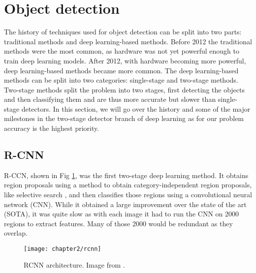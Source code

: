 

\section{Object detection}
The history of techniques used for object detection can be split into two parts: traditional methods and deep learning-based methods. Before 2012 the traditional methods were the most common, as hardware was not yet powerful enough to train deep learning models. After 2012, with hardware becoming more powerful, deep learning-based methods became more common. The deep learning-based methods can be split into two categories: single-stage and two-stage methods. Two-stage methods split the problem into two stages, first detecting the objects and then classifying them and are thus more accurate but slower than single-stage detectors. In this section, we will go over the history and some of the major milestones in the two-stage detector branch of deep learning as for our problem accuracy is the highest priority.

\subsection{R-CNN \cite{rcnn}}
R-CCN, shown in Fig \ref{fig:2_rcnn}, was the first two-stage deep learning method. It obtains region proposals using a method to obtain category-independent region proposals, like selective search \cite{selectivesearch}, and then classifies those regions using a convolutional neural network (CNN). While it obtained a large improvement over the state of the art (SOTA), it was quite slow as with each image it had to run the CNN on 2000 regions to extract features. Many of those 2000 would be redundant as they overlap.

\begin{figure}[H]
	\centering
	\texttt{[image: chapter2/rcnn]}
	\caption{\label{fig:2_rcnn} RCNN architecture. Image from \citet{rcnn}.}
\end{figure}

